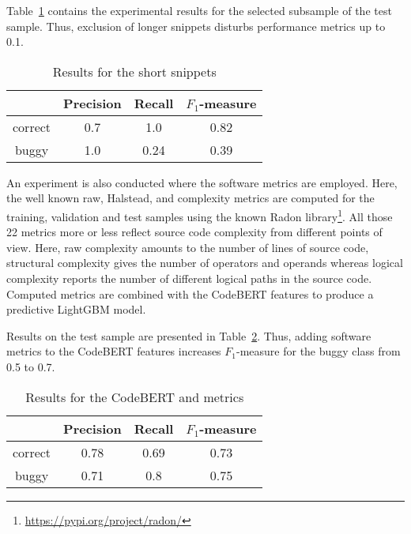 \documentclass[10pt,conference]{IEEEtran}
\begin{document}
Table~\ref{tab9} contains the experimental results for the selected subsample of the test sample.
Thus, exclusion of longer snippets disturbs performance metrics up to 0.1.

\begin{table}[htbp]
\caption{Results for the short snippets}
\begin{center}
\renewcommand{\arraystretch}{1.2}
\begin{tabular}{| c | c | c | c |}
\hline
    & Precision & Recall &$F_1$-measure \\
\hline
  correct & 0.7 & 1.0 & 0.82 \\
\hline
  buggy & 1.0 & 0.24 & 0.39 \\
\hline
\end{tabular}
\label{tab9}
\end{center}
\end{table}

An experiment is also conducted where the software metrics are employed. Here, the well known raw, Halstead, and complexity metrics are computed
for the training, validation and test samples using the known Radon library\footnote{\url{https://pypi.org/project/radon/}}. 
All those 22 metrics more or less reflect source code complexity from different points of view. Here, raw complexity amounts to the number of lines of source code,
structural complexity gives the number of operators and operands whereas logical complexity reports the number of different logical paths in the source code.
Computed metrics are combined with the CodeBERT features to produce a predictive LightGBM model. 

Results on the test sample are presented in Table~\ref{tab10}.
Thus, adding software metrics to the CodeBERT features increases $F_1$-measure for the buggy class from 0.5 to 0.7.

\begin{table}[htbp]
\caption{Results for the CodeBERT and metrics}
\begin{center}
\renewcommand{\arraystretch}{1.2}
\begin{tabular}{| c | c | c | c |}
\hline
    & Precision & Recall &$F_1$-measure \\
\hline
  correct & 0.78 & 0.69 & 0.73 \\
\hline
  buggy & 0.71 & 0.8 & 0.75 \\
\hline
\end{tabular}
\label{tab10}
\end{center}
\end{table}
\end{document}
